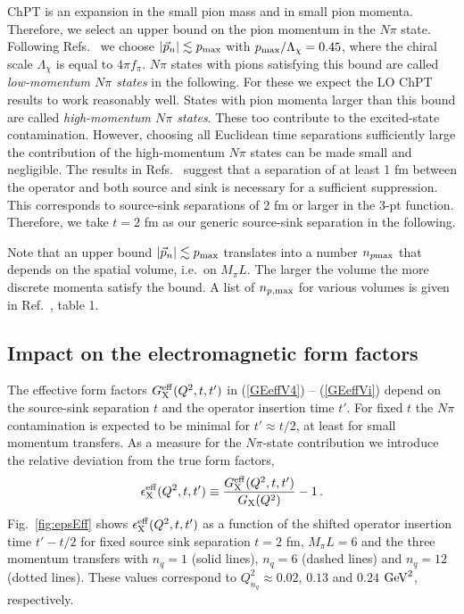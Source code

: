\documentclass[11pt,prd,aps,showpacs,eqsecnum,floatfix,nofootinbib,preprint,tightenlines]{revtex4}
\newcommand{\pref}[1]{(\ref{#1})}
\begin{document}
ChPT is an expansion in the small pion mass and in small pion momenta. Therefore, we select an upper bound on the pion momentum in the $N\pi$ state. Following Refs.\ \cite{Bar:2016uoj,Bar:2016jof} we choose $|\vec{p}_n|\lesssim p_{\rm max}$ with $p_{\rm max}/\Lambda_{\chi}= 0.45$, where the chiral scale $\Lambda_{\chi}$ is equal to $4\pi f_{\pi}$. $N\pi$ states with pions satisfying this bound are called {\em low-momentum $N\pi$ states} in the following. For these we expect the LO ChPT results to work reasonably well. States with pion momenta larger than this bound are called {\em high-momentum $N\pi$ states}. These too contribute to the excited-state contamination. However, choosing all Euclidean time separations sufficiently large the contribution of the high-momentum $N\pi$ states can be made small and negligible. The results in Refs.\ \cite{Bar:2016uoj,Bar:2016jof} suggest that a separation of at least 1 fm between the operator and both source and sink is necessary for a sufficient suppression. This corresponds to source-sink separations of 2 fm or larger in the 3-pt function. Therefore, we take $t=2$ fm as our generic source-sink separation in the following.

Note that an upper bound $|\vec{p}_n|\lesssim p_{\rm max}$ translates into a number $n_{p {\rm max}}$ that depends on the spatial volume, i.e.\ on $M_{\pi}L$. The larger the volume the more discrete momenta satisfy the bound. 
A list of $n_{p, {\rm max}}$ for various volumes is given in Ref.\ \cite{Bar:2018xyi}, table 1.

\subsection{Impact on the electromagnetic form factors}\label{ssect:impactonFFs}

The effective form factors $G^{\rm eff}_{\rm X}(Q^2,t,t')$ in \pref{GEeffV4} -- \pref{GEeffVi}  depend on the source-sink separation $t$ and the operator insertion time $t'$. For fixed $t$ the $N\pi$ contamination is expected to be minimal for $t'\approx t/2$, at least for small momentum transfers. As a measure for the $N\pi$-state contribution we introduce the relative deviation from the true form factors,
\begin{eqnarray}
\epsilon^{\rm eff}_{\rm X}(Q^2,t,t')\equiv \frac{G^{\rm eff}_{\rm X}(Q^2,t,t')}{G_{\rm X}(Q^2)} -1\label{DefEpsilons}\,.
\end{eqnarray}
Fig.\ \ref{fig:epsEff} shows $\epsilon^{\rm eff}_{\rm X}(Q^2,t,t')$ as a function of the shifted operator insertion time $t'-t/2$ for fixed source sink separation $t=2$ fm, $M_{\pi} L=6$ and the three momentum transfers with $n_q=1$ (solid lines), $n_q=6$ (dashed lines) and $n_q=12$ (dotted lines). These values correspond to $Q_{n_q}^2\approx 0.02$, $0.13$ and $0.24$  ${\rm GeV}^2$, respectively. 
\end{document}
